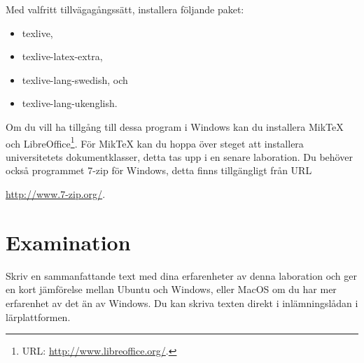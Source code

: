 \documentclass[11pt,a4paper]{miunasgn}
\begin{document}
Med valfritt tillvägagångssätt, installera följande paket:
\begin{itemize}
	\item texlive,
	\item texlive-latex-extra,
	\item texlive-lang-swedish, och
	\item texlive-lang-ukenglish.
\end{itemize}

Om du vill ha tillgång till dessa program i Windows kan du installera MikTeX 
\citep{Bosk2012lui} och LibreOffice\footnote{%
	URL: \url{http://www.libreoffice.org/}.
}.
För MikTeX kan du hoppa över steget att installera universitetets 
dokumentklasser, detta tas upp i en senare laboration.
Du behöver också programmet 7-zip för Windows, detta finns tillgängligt från 
URL
\begin{center}
	\url{http://www.7-zip.org/}.
\end{center}


\section{Examination}
\label{sec:Examination}
\noindent
Skriv en sammanfattande text med dina erfarenheter av denna laboration och ger 
en kort jämförelse mellan Ubuntu och Windows, eller MacOS om du har mer 
erfarenhet av det än av Windows.
Du kan skriva texten direkt i inlämningslådan i lärplattformen.



\end{document}
